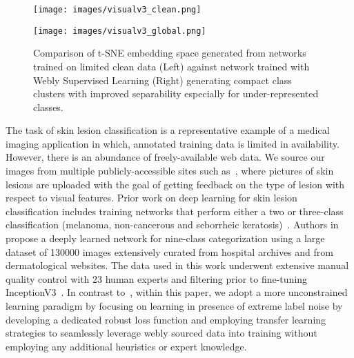 \documentclass{llncs}
\begin{document}
\begin{figure}
\centering
\begin{minipage}{0.5\textwidth}
\begin{center}
\texttt{[image: images/visualv3\_clean.png]}
\end{center}
\end{minipage}\hfill
\begin{minipage}{0.5\textwidth}
\begin{center}
\texttt{[image: images/visualv3\_global.png]}
\end{center}
\end{minipage}
\vspace{-5pt}
\caption{\small{Comparison of t-SNE embedding space generated from networks trained on limited clean data (Left) against network trained with Webly Supervised Learning (Right) generating compact class clusters with improved separability especially for under-represented classes.}}
\label{fig:embedding}
\vspace{-15pt}
\end{figure}
The task of skin lesion classification is a representative example of a medical imaging application in which, annotated training data is limited in availability. However, there is an abundance of freely-available web data. We source our images from multiple publicly-accessible sites such as~\cite{webdata2}, where pictures of skin lesions are uploaded with the goal of getting feedback on the type of lesion with respect to visual features. Prior work on deep learning for skin lesion classification includes training networks that perform either a two or three-class classification (melanoma, non-cancerous and seborrheic keratosis)~\cite{tmi1,isicpaper1,isbi1}. Authors in~\cite{naturepaper} propose a deeply learned network for nine-class categorization using a large dataset of 130000 images extensively curated from hospital archives and from dermatological websites. The data used in this work underwent extensive manual quality control with 23 human experts and filtering prior to fine-tuning InceptionV3~\cite{inceptionv3}. In contrast to~\cite{naturepaper}, within this paper, we adopt a more unconstrained learning paradigm by focusing on learning in presence of extreme label noise by developing a dedicated robust loss function and employing transfer learning strategies to seamlessly leverage webly sourced data into training without employing any additional heuristics or expert knowledge.
\end{document}
